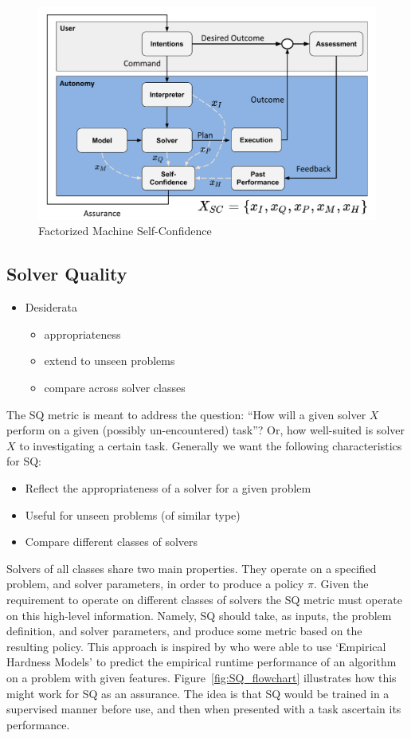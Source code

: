     \begin{figure}[tbp]
        \centering
        \includegraphics[width=0.65\linewidth]{Figures/SC_flowchart.pdf}
        \caption{Factorized Machine Self-Confidence}
        \label{fig:famsec}
    \end{figure}

\subsection{Solver Quality}
    \begin{itemize}
        \item Desiderata
        \begin{itemize}
            \item appropriateness
            \item extend to unseen problems
            \item compare across solver classes
        \end{itemize}
    \end{itemize}
    The SQ metric is meant to address the question: ``How will a given solver $X$ perform on a given (possibly un-encountered) task''? Or, how well-suited is solver $X$ to investigating a certain task. Generally we want the following characteristics for SQ:

    \begin{itemize}
        \item Reflect the appropriateness of a solver for a given problem
        \item Useful for unseen problems (of similar type)
        \item Compare different classes of solvers
    \end{itemize}

    Solvers of all classes share two main properties. They operate on a specified problem, and solver parameters, in order to produce a policy $\pi$. Given the requirement to operate on different classes of solvers the SQ metric must operate on this high-level information. Namely, SQ should take, as inputs, the problem definition, and solver parameters, and produce some metric based on the resulting policy. This approach is inspired by \cite{Leyton-Brown2009-yr} who were able to use `Empirical Hardness Models' to predict the empirical runtime performance of an algorithm on a problem with given features. Figure~\ref{fig:SQ_flowchart} illustrates how this might work for SQ as an assurance. The idea is that SQ would be trained in a supervised manner before use, and then when presented with a task ascertain its performance.

